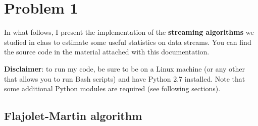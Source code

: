
\section{Problem 1}

In what follows, I present the implementation of the \textbf{streaming algorithms} we studied in class to estimate some useful statistics on data streams. You can find the source code in the material attached with this documentation.\medskip

\noindent\textbf{Disclaimer}: to run my code, be sure to be on a Linux machine (or any other that allows you to run Bash scripts) and have Python 2.7 installed. Note that some additional Python modules are required (see following sections).


\subsection{Flajolet-Martin algorithm}

